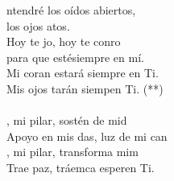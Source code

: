 \begin{cancion}%
	ntendré los oídos abiertos,\\
	los ojos atos.\\
	Hoy te jo, hoy te conro\\
	para que estésiempre en mí.\\
	Mi coran estará siempre en Ti.\\
	Mis ojos tarán siempen Ti. (**)\\
	\jump\\
	, mi pilar, sostén de mid\\
	Apoyo en mis das, luz de mi can\\
	, mi pilar, transforma mim\\
	Trae paz, tráemca esperen Ti.\\
\end{cancion}%
